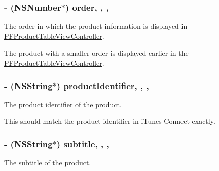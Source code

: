 \subsubsection[{order}]{\setlength{\rightskip}{0pt plus 5cm}-\/ (N\+S\+Number$\ast$) order\hspace{0.3cm}{\ttfamily [read]}, {\ttfamily [write]}, {\ttfamily [nonatomic]}, {\ttfamily [strong]}}\label{interface_p_f_product_a8e78e9f4607e77954c425698ec7a151f}
The order in which the product information is displayed in {\ttfamily \hyperlink{interface_p_f_product_table_view_controller}{P\+F\+Product\+Table\+View\+Controller}}.

The product with a smaller order is displayed earlier in the {\ttfamily \hyperlink{interface_p_f_product_table_view_controller}{P\+F\+Product\+Table\+View\+Controller}}. \hypertarget{interface_p_f_product_a354f59da62a2d695096b10f36e75a084}{}
\subsubsection[{product\+Identifier}]{\setlength{\rightskip}{0pt plus 5cm}-\/ (N\+S\+String$\ast$) product\+Identifier\hspace{0.3cm}{\ttfamily [read]}, {\ttfamily [write]}, {\ttfamily [nonatomic]}, {\ttfamily [strong]}}\label{interface_p_f_product_a354f59da62a2d695096b10f36e75a084}




 





The product identifier of the product.

This should match the product identifier in i\+Tunes Connect exactly. \hypertarget{interface_p_f_product_a83e9bd4db5d395daf5d7d61094d0293d}{}
\subsubsection[{subtitle}]{\setlength{\rightskip}{0pt plus 5cm}-\/ (N\+S\+String$\ast$) subtitle\hspace{0.3cm}{\ttfamily [read]}, {\ttfamily [write]}, {\ttfamily [nonatomic]}, {\ttfamily [strong]}}\label{interface_p_f_product_a83e9bd4db5d395daf5d7d61094d0293d}
The subtitle of the product. \hypertarget{interface_p_f_product_aca711bfd74798b7d0563d5ff5719c6d9}{}
